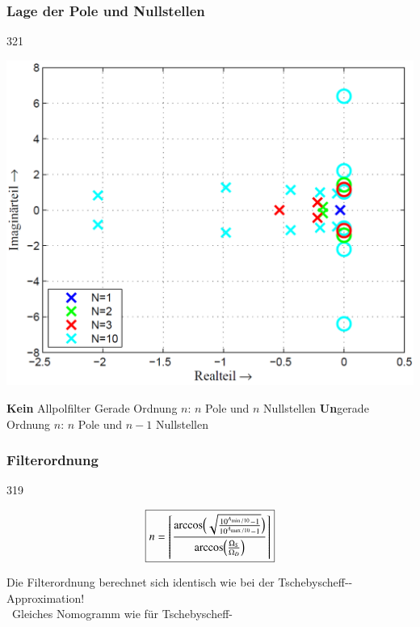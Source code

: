 \subsubsection{Lage der Pole und Nullstellen}{321}

\begin{minipage}[c]{0.4\columnwidth}
    \includegraphics[width=\columnwidth]{images/filter_tschebyscheff_invers_pollage.png}
\end{minipage}
\hfill
\begin{minipage}[c]{0.58\columnwidth}
    \begin{outline}
        \1 \textbf{Kein} Allpolfilter
            \2 Gerade Ordnung $n$: $n$ Pole und $n$ Nullstellen
            \2 \textbf{Un}gerade Ordnung $n$: $n$ Pole und $n-1$ Nullstellen
    \end{outline}
\end{minipage}


\subsubsection{Filterordnung}{319}

\begin{minipage}[c]{0.4\columnwidth}
    $$ \boxed{ n =  \left\lceil \frac{\arccos \Bigl( \sqrt{ \frac{10^{A_{\min / 10}} - 1}{10^{A_{\max / 10}} - 1} } \Bigr) }
    {\arccos \Bigl( \frac{\Omega_S}{\Omega_D} \Bigr)}  \right\rceil } $$
\end{minipage}
\hfill
\begin{minipage}[c]{0.58\columnwidth}
    Die Filterordnung berechnet sich identisch wie bei der Tschebyscheff--Approximation! \\
    \textrightarrow\ Gleiches Nomogramm wie für Tschebyscheff-
\end{minipage}


